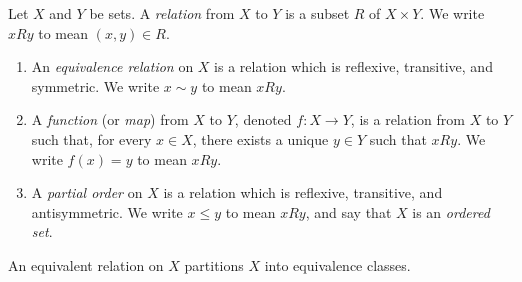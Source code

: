     \begin{definition}
        Let $X$ and $Y$ be sets. A \textit{relation} from $X$ to $Y$ is a subset $R$ of $X \times Y$. We write $xRy$ to mean $(x,y) \in R$.
            \begin{enumerate}[label = (\arabic*),itemsep=1pt,topsep=3pt]
                \item An \textit{equivalence relation} on $X$ is a relation which is reflexive, transitive, and symmetric. We write $x \sim y$ to mean $xRy$.
                \item A \textit{function} (or \textit{map}) from $X$ to $Y$, denoted $f:X \rightarrow Y$, is a relation from $X$ to $Y$ such that, for every $x \in X$, there exists a unique $y \in Y$ such that $xRy$. We write $f(x) = y$ to mean $xRy$.
                \item A \textit{partial order} on $X$ is a relation which is reflexive, transitive, and antisymmetric. We write $x \leq y$ to mean $xRy$, and say that $X$ is an \textit{ordered set}.
            \end{enumerate}
    \end{definition}

    \begin{example}
        An equivalent relation on $X$ partitions $X$ into equivalence classes.
    \end{example}

